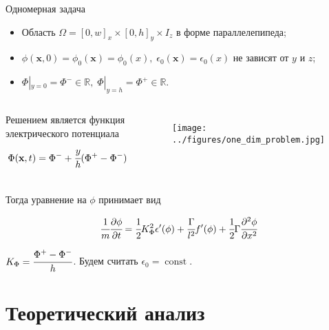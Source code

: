 \documentclass{beamer}
\DeclareMathOperator{\Const}{const}
\newcommand*{\hm}[1]{#1\nobreak\discretionary{}
{\hbox{$\mathsurround=0pt #1$}}{}}
\begin{document}
\begin{frame}{Одномерная задача}
\vspace{-0.2cm}
\begin{itemize}
	\item Область $\Omega = [0, w]_x \times [0, h]_y \times I_z$ в форме параллелепипеда;
	\item $\phi(\textbf{x}, 0) = \phi_0(\textbf{x}) = \phi_0(x), \; \epsilon_0(\textbf{x}) =
	\epsilon_0(x)$ не зависят от $y$ и $z$;
	\item $\Phi|_{y = 0} = \Phi^- \in \mathbb{R}, \; \Phi|_{y = h} = \Phi^+ \in \mathbb{R}$.
\end{itemize}
\vspace{-0.5cm}
\begin{columns}
Решением является функция электрического потенциала
\vspace{-0.2cm}
$$\Phi(\textbf{x}, t) = \Phi^- \hm + \cfrac{y}{h}(\Phi^+ - \Phi^-)$$
\begin{figure}
	\vspace*{-0.3cm}
	\hspace*{0.5cm}
	\texttt{[image: ../figures/one\_dim\_problem.jpg]}
\end{figure}
\end{columns}
\vspace{-0.4cm}
Тогда уравнение на $\phi$ принимает вид
\begin{block}{}
	$$\cfrac{1}{m} \cfrac{\partial \phi}{\partial t} = \cfrac{1}{2} K_\Phi^2 \epsilon'(\phi) +
	\cfrac{\Gamma}{l^2} f'(\phi) + \cfrac{1}{2} \Gamma \cfrac{\partial^2 \phi}{\partial x^2}$$
\end{block}
$K_\Phi = \cfrac{\Phi^+ - \Phi^-}{h}$. Будем считать $\epsilon_0 = \Const$.
\end{frame}


\section{Теоретический анализ}
\end{document}
